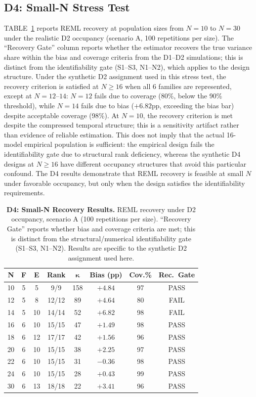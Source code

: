 \documentclass{ieeeaccess}
\theoremstyle{definition}
\theoremstyle{plain}
\begin{document}
\subsection{D4: Small-N Stress Test}
TABLE~\ref{tab:d4} reports REML recovery at population sizes from $N = 10$ to $N = 30$ under the realistic D2 occupancy (scenario A, 100 repetitions per size). The ``Recovery Gate'' column reports whether the estimator recovers the true variance share within the bias and coverage criteria from the D1--D2 simulations; this is distinct from the identifiability gate (S1--S3, N1--N2), which applies to the design structure. Under the synthetic D2 assignment used in this stress test, the recovery criterion is satisfied at $N \geq 16$ when all 6 families are represented, except at $N = 12$--$14$: $N = 12$ fails due to coverage (80\%, below the 90\% threshold), while $N = 14$ fails due to bias ($+6.82$pp, exceeding the bias bar) despite acceptable coverage (98\%). At $N = 10$, the recovery criterion is met despite the compressed temporal structure; this is a sensitivity artifact rather than evidence of reliable estimation. This does not imply that the actual 16-model empirical population is sufficient: the empirical design fails the identifiability gate due to structural rank deficiency, whereas the synthetic D4 designs at $N \geq 16$ have different occupancy structures that avoid this particular confound. The D4 results demonstrate that REML recovery is feasible at small $N$ under favorable occupancy, but only when the design satisfies the identifiability requirements.

\begin{table}[!t]
\caption{\textbf{D4: Small-N Recovery Results.} REML recovery under D2 occupancy, scenario A (100 repetitions per size). ``Recovery Gate'' reports whether bias and coverage criteria are met; this is distinct from the structural/numerical identifiability gate (S1--S3, N1--N2). Results are specific to the synthetic D2 assignment used here.}
\label{tab:d4}
\centering
\footnotesize
\begin{tabular}{c c c c c c c c}
\hline
\textbf{N} & \textbf{F} & \textbf{E} & \textbf{Rank} & $\boldsymbol{\kappa}$ & \textbf{Bias (pp)} & \textbf{Cov.\%} & \textbf{Rec.\ Gate} \\
\hline
10 & 5 & 5 & 9/9 & 158 & $+4.84$ & 97 & PASS \\
\hline
12 & 5 & 8 & 12/12 & 89 & $+4.64$ & 80 & FAIL \\
\hline
14 & 5 & 10 & 14/14 & 52 & $+6.82$ & 98 & FAIL \\
\hline
16 & 6 & 10 & 15/15 & 47 & $+1.49$ & 98 & PASS \\
\hline
18 & 6 & 12 & 17/17 & 42 & $+1.56$ & 96 & PASS \\
\hline
20 & 6 & 10 & 15/15 & 38 & $+2.25$ & 97 & PASS \\
\hline
22 & 6 & 10 & 15/15 & 31 & $-0.36$ & 98 & PASS \\
\hline
24 & 6 & 10 & 15/15 & 28 & $+0.43$ & 99 & PASS \\
\hline
30 & 6 & 13 & 18/18 & 22 & $+3.41$ & 96 & PASS \\
\hline
\end{tabular}
\end{table}
\end{document}
